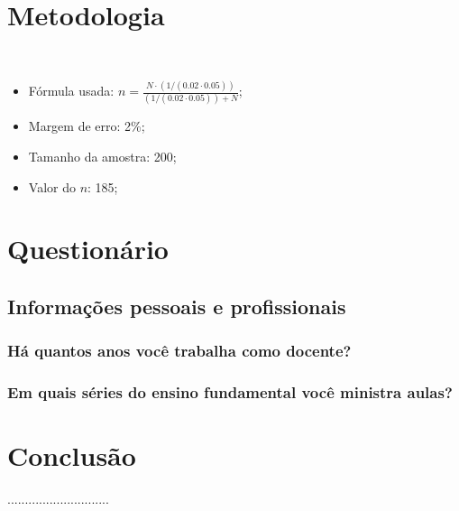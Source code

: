 \documentclass[17pt]{extarticle} %
\begin{document}
    \section{Metodologia}

    \   \begin{itemize} %
            \item Fórmula usada: \( n = \frac{N \cdot (1 / (0.02 \cdot 0.05))}{(1 / (0.02 \cdot 0.05)) + N} \);

            \item Margem de erro: 2\%;
            \item Tamanho da amostra: 200;
            \item Valor do \( n \): 185;
        \end{itemize} %

    \newpage


    \section{Questionário}


        \subsection{Informações pessoais e profissionais}

            \subsubsection{Há quantos anos você trabalha como docente?\enspace\hrulefill}

            \subsubsection{Em quais séries do ensino fundamental você ministra aulas?}

            \vspace{3mm} 



    \newpage



\section{Conclusão}
.............................
\end{document}
